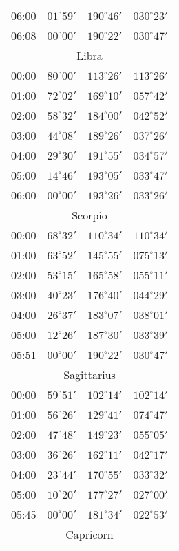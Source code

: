\begin{table}
\begin{Parallel}{}{}
{{\begin{tabular}{l|lll}
06:00 & $01^\circ 59'$ & $190^\circ 46'$& $030^\circ 23'$ \\
06:08 & $00^\circ 00'$ & $190^\circ 22'$& $030^\circ 47'$ \\
\multicolumn{4}{c}{Libra}\\
00:00 & $80^\circ 00'$ & $113^\circ 26'$& $113^\circ 26'$ \\
01:00 & $72^\circ 02'$ & $169^\circ 10'$& $057^\circ 42'$ \\
02:00 & $58^\circ 32'$ & $184^\circ 00'$& $042^\circ 52'$ \\
03:00 & $44^\circ 08'$ & $189^\circ 26'$& $037^\circ 26'$ \\
04:00 & $29^\circ 30'$ & $191^\circ 55'$& $034^\circ 57'$ \\
05:00 & $14^\circ 46'$ & $193^\circ 05'$& $033^\circ 47'$ \\
06:00 & $00^\circ 00'$ & $193^\circ 26'$& $033^\circ 26'$ \\
\multicolumn{4}{c}{Scorpio}\\
00:00 & $68^\circ 32'$ & $110^\circ 34'$& $110^\circ 34'$ \\
01:00 & $63^\circ 52'$ & $145^\circ 55'$& $075^\circ 13'$ \\
02:00 & $53^\circ 15'$ & $165^\circ 58'$& $055^\circ 11'$ \\
03:00 & $40^\circ 23'$ & $176^\circ 40'$& $044^\circ 29'$ \\
04:00 & $26^\circ 37'$ & $183^\circ 07'$& $038^\circ 01'$ \\
05:00 & $12^\circ 26'$ & $187^\circ 30'$& $033^\circ 39'$ \\
05:51 & $00^\circ 00'$ & $190^\circ 22'$& $030^\circ 47'$ \\
\multicolumn{4}{c}{Sagittarius}\\
00:00 & $59^\circ 51'$ & $102^\circ 14'$& $102^\circ 14'$ \\
01:00 & $56^\circ 26'$ & $129^\circ 41'$& $074^\circ 47'$ \\
02:00 & $47^\circ 48'$ & $149^\circ 23'$& $055^\circ 05'$ \\
03:00 & $36^\circ 26'$ & $162^\circ 11'$& $042^\circ 17'$ \\
04:00 & $23^\circ 44'$ & $170^\circ 55'$& $033^\circ 32'$ \\
05:00 & $10^\circ 20'$ & $177^\circ 27'$& $027^\circ 00'$ \\
05:45 & $00^\circ 00'$ & $181^\circ 34'$& $022^\circ 53'$ \\
\multicolumn{4}{c}{Capricorn}\\

\end{tabular}}}
\end{Parallel}
\end{table}
